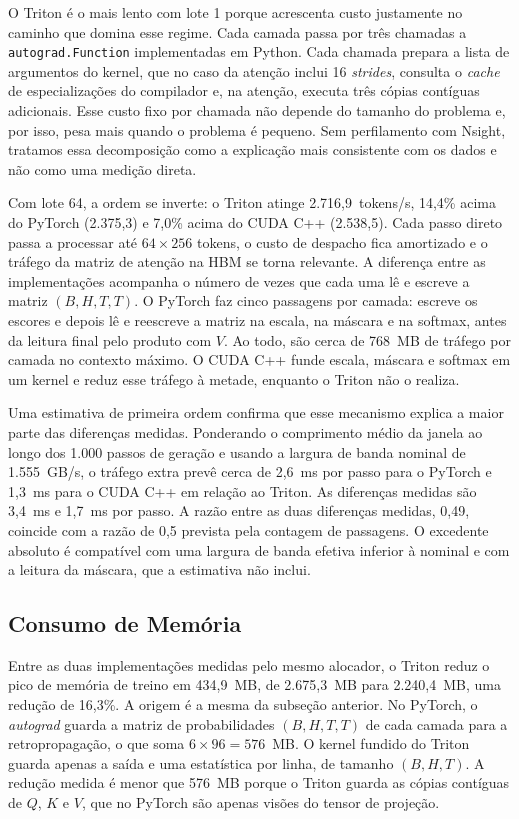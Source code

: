 \documentclass[conference]{IEEEtran}
\begin{document}
O Triton é o mais lento com lote 1 porque acrescenta custo justamente no caminho que domina esse regime. Cada camada passa por três chamadas a \texttt{autograd.Function} implementadas em Python. Cada chamada prepara a lista de argumentos do kernel, que no caso da atenção inclui 16 \textit{strides}, consulta o \textit{cache} de especializações do compilador e, na atenção, executa três cópias contíguas adicionais. Esse custo fixo por chamada não depende do tamanho do problema e, por isso, pesa mais quando o problema é pequeno. Sem perfilamento com Nsight, tratamos essa decomposição como a explicação mais consistente com os dados e não como uma medição direta.

Com lote 64, a ordem se inverte: o Triton atinge 2.716,9~tokens/s, 14,4\% acima do PyTorch (2.375,3) e 7,0\% acima do CUDA C++ (2.538,5). Cada passo direto passa a processar até $64 \times 256$ tokens, o custo de despacho fica amortizado e o tráfego da matriz de atenção na HBM se torna relevante. A diferença entre as implementações acompanha o número de vezes que cada uma lê e escreve a matriz $(B,H,T,T)$. O PyTorch faz cinco passagens por camada: escreve os escores e depois lê e reescreve a matriz na escala, na máscara e na softmax, antes da leitura final pelo produto com $V$. Ao todo, são cerca de 768~MB de tráfego por camada no contexto máximo. O CUDA C++ funde escala, máscara e softmax em um kernel e reduz esse tráfego à metade, enquanto o Triton não o realiza.

Uma estimativa de primeira ordem confirma que esse mecanismo explica a maior parte das diferenças medidas. Ponderando o comprimento médio da janela ao longo dos 1.000 passos de geração e usando a largura de banda nominal de 1.555~GB/s, o tráfego extra prevê cerca de 2,6~ms por passo para o PyTorch e 1,3~ms para o CUDA C++ em relação ao Triton. As diferenças medidas são 3,4~ms e 1,7~ms por passo. A razão entre as duas diferenças medidas, 0,49, coincide com a razão de 0,5 prevista pela contagem de passagens. O excedente absoluto é compatível com uma largura de banda efetiva inferior à nominal e com a leitura da máscara, que a estimativa não inclui.

\subsection{Consumo de Memória}
\label{sec:vram}

Entre as duas implementações medidas pelo mesmo alocador, o Triton reduz o pico de memória de treino em 434,9~MB, de 2.675,3~MB para 2.240,4~MB, uma redução de 16,3\%. A origem é a mesma da subseção anterior. No PyTorch, o \textit{autograd} guarda a matriz de probabilidades $(B,H,T,T)$ de cada camada para a retropropagação, o que soma $6 \times 96 = 576$~MB. O kernel fundido do Triton guarda apenas a saída e uma estatística por linha, de tamanho $(B,H,T)$. A redução medida é menor que 576~MB porque o Triton guarda as cópias contíguas de $Q$, $K$ e $V$, que no PyTorch são apenas visões do tensor de projeção.
\end{document}

